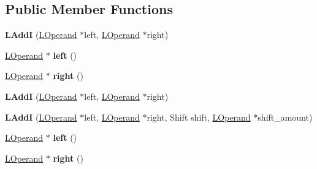 \subsection*{Public Member Functions}
\begin{DoxyCompactItemize}
\item 
{\bfseries L\+AddI} (\hyperlink{classv8_1_1internal_1_1_l_operand}{L\+Operand} $\ast$left, \hyperlink{classv8_1_1internal_1_1_l_operand}{L\+Operand} $\ast$right)\hypertarget{classv8_1_1internal_1_1_l_add_i_a1c9a395df235ade208c31ac21beb3e7d}{}\label{classv8_1_1internal_1_1_l_add_i_a1c9a395df235ade208c31ac21beb3e7d}

\item 
\hyperlink{classv8_1_1internal_1_1_l_operand}{L\+Operand} $\ast$ {\bfseries left} ()\hypertarget{classv8_1_1internal_1_1_l_add_i_a407308642b2aeb186f85871212fe2e23}{}\label{classv8_1_1internal_1_1_l_add_i_a407308642b2aeb186f85871212fe2e23}

\item 
\hyperlink{classv8_1_1internal_1_1_l_operand}{L\+Operand} $\ast$ {\bfseries right} ()\hypertarget{classv8_1_1internal_1_1_l_add_i_a8223ba3d493e68c5a14a2ddff0685b91}{}\label{classv8_1_1internal_1_1_l_add_i_a8223ba3d493e68c5a14a2ddff0685b91}

\item 
{\bfseries L\+AddI} (\hyperlink{classv8_1_1internal_1_1_l_operand}{L\+Operand} $\ast$left, \hyperlink{classv8_1_1internal_1_1_l_operand}{L\+Operand} $\ast$right)\hypertarget{classv8_1_1internal_1_1_l_add_i_a1c9a395df235ade208c31ac21beb3e7d}{}\label{classv8_1_1internal_1_1_l_add_i_a1c9a395df235ade208c31ac21beb3e7d}

\item 
{\bfseries L\+AddI} (\hyperlink{classv8_1_1internal_1_1_l_operand}{L\+Operand} $\ast$left, \hyperlink{classv8_1_1internal_1_1_l_operand}{L\+Operand} $\ast$right, Shift shift, \hyperlink{classv8_1_1internal_1_1_l_operand}{L\+Operand} $\ast$shift\+\_\+amount)\hypertarget{classv8_1_1internal_1_1_l_add_i_adabedf9727f9c35aabd0d6f8380e09bf}{}\label{classv8_1_1internal_1_1_l_add_i_adabedf9727f9c35aabd0d6f8380e09bf}

\item 
\hyperlink{classv8_1_1internal_1_1_l_operand}{L\+Operand} $\ast$ {\bfseries left} ()\hypertarget{classv8_1_1internal_1_1_l_add_i_a407308642b2aeb186f85871212fe2e23}{}\label{classv8_1_1internal_1_1_l_add_i_a407308642b2aeb186f85871212fe2e23}

\item 
\hyperlink{classv8_1_1internal_1_1_l_operand}{L\+Operand} $\ast$ {\bfseries right} ()\hypertarget{classv8_1_1internal_1_1_l_add_i_a8223ba3d493e68c5a14a2ddff0685b91}{}\label{classv8_1_1internal_1_1_l_add_i_a8223ba3d493e68c5a14a2ddff0685b91}


\end{DoxyCompactItemize}

